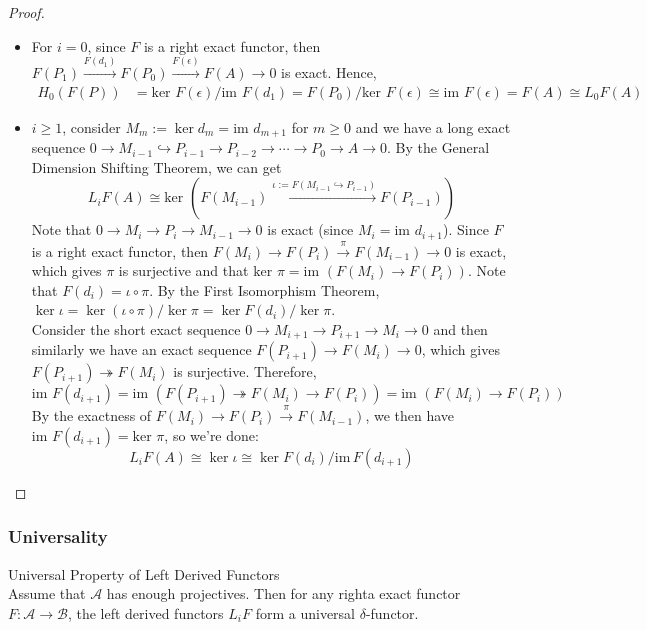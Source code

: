 \begin{proof}
    \begin{itemize}
        \item For $i=0$, since $F$ is a right exact functor, then $F(P_1) \xrightarrow{F(d_1)} F(P_0) \xrightarrow{F(\epsilon)} F(A) \to0$ is exact. Hence,
        \begin{align*}
            H_0 (F(P))&= \text{ker }F(\epsilon)/ \text{im }F(d_1)
            =F(P_0)/ \text{ker } F(\epsilon) \cong
            \text{im } F(\epsilon)= F(A) \cong L_0F(A)
        \end{align*}

        \item $i\geq1$, consider $M_m:= \ker d_m= \text{im }d_{m+1}$ for $m\geq 0$ and we have a long exact sequence $0\to M_{i-1} \hookrightarrow P_{i-1} \to P_{i-2} \to \cdots \to P_0\to A\to0$. By the General Dimension Shifting Theorem, we can get
        \[
        L_i F(A) \cong \text{ker }(F(M_{i-1}) \xrightarrow{\iota:= F(M_{i-1} \hookrightarrow P_{i-1})} F(P_{i-1}))
        \]
        Note that $0\to M_i\to P_i\to M_{i-1} \to0$ is exact (since $M_i= \text{im }d_{i+1}$). Since $F$ is a right exact functor, then $F(M_i) \to F(P_i) \xrightarrow{\pi} F(M_{i-1}) \to0$ is exact, which gives $\pi$ is surjective and that $\text{ker }\pi= \text{im }(F(M_i) \to F(P_i))$. Note that $F(d_i)= \iota \circ \pi$. By the First Isomorphism Theorem, $\ker \iota= \ker (\iota\circ \pi)/ \ker \pi= \ker F(d_i)/ \ker \pi$.\\
        Consider the short exact sequence $0\to M_{i+1} \to P_{i+1} \to M_i\to0$ and then similarly we have an exact sequence $F(P_{i+1}) \to F(M_i) \to 0$, which gives $F(P_{i+1}) \twoheadrightarrow F(M_i)$ is surjective. Therefore,
        \[
        \text{im }F(d_{i+1})= \text{im }(F(P_{i+1}) \twoheadrightarrow F(M_i) \to F(P_i)) = \text{im }(F(M_i) \to F(P_i))
        \]
        By the exactness of $F(M_i)\to F(P_i) \xrightarrow{\pi} F(M_{i-1})$, we then have $\text{im }F(d_{i+1})= \text{ker }\pi$, so we're done:
        \[
        L_iF(A) \cong \ker \iota \cong \ker F(d_i)/ \text{im}\, F(d_{i+1})
        \]
    \end{itemize}
\end{proof}

\subsubsection{Universality}

\begin{theorem}{Universal Property of Left Derived Functors}\\
Assume that $\mathcal{A}$ has enough projectives. Then for any righta exact functor $F:\mathcal{A} \to \mathcal{B}$, the left derived functors $L_iF$ form a universal $\delta$-functor.
\end{theorem}


